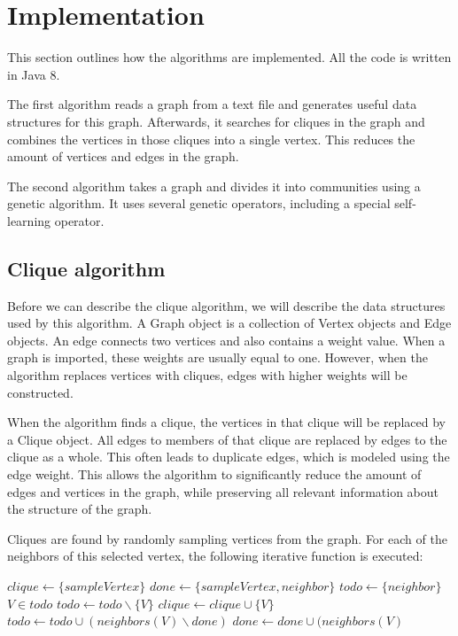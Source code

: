 \section{Implementation}
\label{sec:implementation}
This section outlines how the algorithms are implemented. All the code is written in Java 8.
\par
 The first algorithm reads a graph from a text file and generates useful data structures for this graph. Afterwards, it searches for cliques in the graph and combines the vertices in those cliques into a single vertex. This reduces the amount of vertices and edges in the graph.
\par
The second algorithm takes a graph and divides it into communities using a genetic algorithm. It uses several genetic operators, including a special self-learning operator.
\subsection{Clique algorithm}
Before we can describe the clique algorithm, we will describe the data structures used by this algorithm. A Graph object is a collection of Vertex objects and Edge objects. An edge connects two vertices and also contains a weight value. When a graph is imported, these weights are usually equal to one. However, when the algorithm replaces vertices with cliques, edges with higher weights will be constructed. 
\par
When the algorithm finds a clique, the vertices in that clique will be replaced by a Clique object. All edges to members of that clique are replaced by edges to the clique as a whole. This often leads to duplicate edges, which is modeled using the edge weight. This allows the algorithm to significantly reduce the amount of edges and vertices in the graph, while preserving all relevant information about the structure of the graph.
\par
Cliques are found by randomly sampling vertices from the graph. For each of the neighbors of this selected vertex, the following iterative function is executed:
\\
\begin{algorithmic}
\STATE $clique \leftarrow \{sampleVertex\}$
\STATE $done \leftarrow \{sampleVertex, neighbor\}$
\STATE $todo \leftarrow \{neighbor\}$
\STATE $V \in todo$
\STATE $todo \leftarrow todo \backslash \{V\}$
\STATE $clique \leftarrow clique \cup \{V\}$
\STATE $todo \leftarrow todo \cup (neighbors(V) \backslash done )$
\STATE $done \leftarrow done \cup(neighbors(V)$
\ENDIF
\ENDWHILE
{}
\ELSE
\RETURN{$\{\}$}
\ENDIF
\end{algorithmic}

